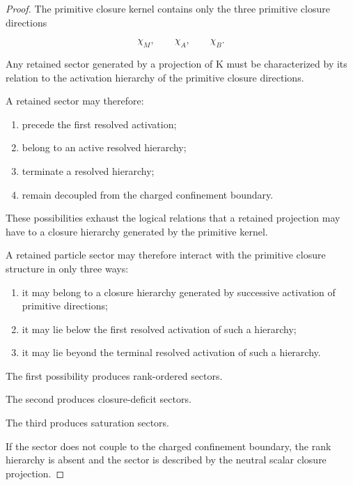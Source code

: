 \documentclass[11pt]{article}
\theoremstyle{definition}
\theoremstyle{remark}
\begin{document}
\begin{proof}

The primitive closure kernel contains only the three primitive
closure directions

\begin{equation}
\chi_M,
\qquad
\chi_A,
\qquad
\chi_B.
\end{equation}

Any retained sector generated by a projection of
\mathcal K must be characterized by its relation to the
activation hierarchy of the primitive closure directions.

A retained sector may therefore:

\begin{enumerate}
\item precede the first resolved activation;
\item belong to an active resolved hierarchy;
\item terminate a resolved hierarchy;
\item remain decoupled from the charged confinement boundary.
\end{enumerate}

These possibilities exhaust the logical relations that a
retained projection may have to a closure hierarchy generated
by the primitive kernel.

A retained particle sector may therefore interact with the
primitive closure structure in only three ways:

\begin{enumerate}

\item it may belong to a closure hierarchy generated by
successive activation of primitive directions;

\item it may lie below the first resolved activation of such a
hierarchy;

\item it may lie beyond the terminal resolved activation of such
a hierarchy.

\end{enumerate}

The first possibility produces rank-ordered sectors.

The second produces closure-deficit sectors.

The third produces saturation sectors.

If the sector does not couple to the charged confinement
boundary, the rank hierarchy is absent and the sector is
described by the neutral scalar closure projection.


\end{proof}
\end{document}
